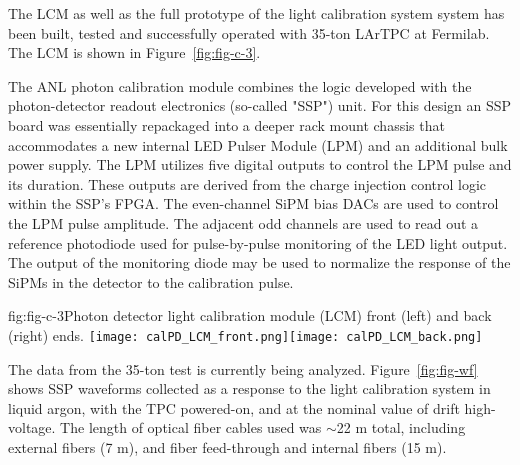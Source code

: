 The LCM as well as the full prototype of the light calibration system system has been built, tested and successfully operated with 35-ton LArTPC at Fermilab. The LCM is shown in Figure~\ref{fig:fig-c-3}. 

The ANL photon calibration module  combines the logic developed with the photon-detector readout electronics (so-called "SSP") unit.  
For this design an SSP board was essentially repackaged into a deeper rack mount 
chassis  that accommodates a new internal LED Pulser Module (LPM) and an additional bulk power supply. The LPM utilizes five digital outputs to control the LPM pulse and its duration.  
These outputs are derived from the charge injection control logic within the SSP's FPGA.  The even-channel SiPM bias DACs  are used to control the LPM pulse amplitude.  
The adjacent odd channels are used to read out a reference photodiode used for pulse-by-pulse monitoring of the LED light output.  The output of the monitoring diode may be used to normalize 
the response of the SiPMs in the detector to the calibration pulse.

%
 \begin{cdrfigure}[]{fig:fig-c-3}{Photon detector light calibration module (LCM) front (left) and back (right) ends.}
\texttt{[image: calPD\_LCM\_front.png]}\texttt{[image: calPD\_LCM\_back.png]}
\end{cdrfigure}


The data from the 35-ton test is currently being analyzed. %
Figure~\ref{fig:fig-wf} shows SSP waveforms collected as a response to the light calibration system %
in liquid argon, with the TPC powered-on, and at the nominal value of drift high-voltage.  
The length of optical fiber cables used %
was $\sim$22 m total, including external fibers (7 m), and fiber feed-through and internal fibers (15 m).

